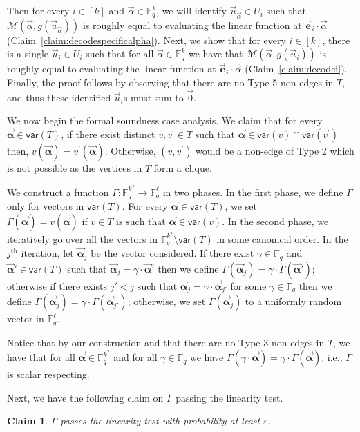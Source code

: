\documentclass[10pt,a4paper]{article}
\newcommand{\F}{\mathbb{F}}
\newtheorem{claim}[theorem]{Claim}
\newcommand{\alphab}{\vec{\bm{\alpha}}}
\newcommand{\var}{\mathsf{var}}
\newcommand{\M}{\mathcal{M}}
\begin{document}
Then for every $i\in[k]$ and $\vec{\alpha}\in\F_q^k$, we will identify  $\vec{u}_{\vec{\alpha}}\in U_i$ such that $\M(\vec{\alpha},g(\vec{u}_{\vec{\alpha}}))$ is roughly equal to evaluating the linear function at $\vec{\bm e}_i\cdot \vec{\alpha}$ (Claim~\ref{claim:decodespecificalpha}). Next, we show that for every $i\in[k]$, there is a single $\vec{u}_i\in U_i$  such that for all $\vec{\alpha}\in \F_q^k$ we have that  $\M(\vec{\alpha},g(\vec{u}_i))$ is roughly equal to evaluating the linear function at $\vec{\bm e}_i\cdot \vec{\alpha}$ (Claim~\ref{claim:decodei}). Finally, the proof follows by  observing that there are no Type 5 non-edges in $T$, and thus   these identified $\vec{u}_i$s must sum to $\vec{0}$. 


We now begin the formal soundness case analysis. We claim that for every $\alphab\in \var(T)$, if there exist distinct $v,v^{\prime}\in T$ such that $\alphab\in \var(v)\cap\var(v^{\prime})$ then, $v(\alphab)=v^{\prime}(\alphab)$. Otherwise, $(v,v^{\prime})$ would be a non-edge of Type 2 which is not possible as the vertices in $T$ form a clique. 

We construct a function $\Gamma:\F_q^{k^2}\to \F_q^\ell$  in two phases. In the first phase, we define $\Gamma$ only for vectors in $\var(T)$.   For every $\vec{\bm{\alpha}}\in\var(T)$, we set $
\Gamma(\vec{\bm{\alpha}})=
v(\vec{\bm{\alpha}})\text{ if }v\in T\text{ is such that }\vec{\bm{\alpha}}\in \var(v)$.
In the second phase, 
we iteratively go over all the vectors in $\F_q^{k^2}\setminus \var(T)$ in some canonical order. In the $j^{\text{th}}$ iteration, let $\alphab_j$ be the vector considered. If there exist $\gamma\in \F_q$ and $\alphab'\in \var(T)$ such that $\alphab_j=\gamma\cdot \alphab'$ then we define $\Gamma(\alphab_j)=\gamma\cdot \Gamma(\alphab')$; otherwise if there exists $j'<j$ such that $\alphab_j=\gamma\cdot \alphab_{j'}$ for some $\gamma\in\F_q$ then we define $\Gamma(\alphab_j)=\gamma\cdot \Gamma(\alphab_{j'})$; otherwise, we set $\Gamma(\alphab_j)$ to a uniformly random vector in $\F_q^\ell$. 

Notice that by our construction and that there are no Type 3 non-edges in $T$, we have that for all $\alphab\in \F_q^{k^2}$ and for all $\gamma\in \F_q$ we have $\Gamma(\gamma\cdot\alphab)=\gamma\cdot \Gamma(\alphab)$, i.e., $\Gamma$ is scalar respecting. 

Next, we have the following claim on $\Gamma$ passing the linearity test.

\begin{claim}\label{claim:lintest}
$\Gamma$ passes the linearity test with probability at least $\varepsilon$. 
\end{claim}
\end{document}
